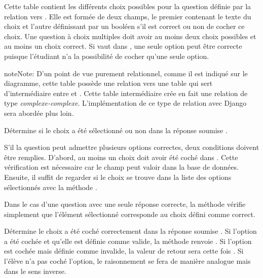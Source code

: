 \documentclass[a4,10pt,french]{sphinxmanual}
\begin{document}
\begin{fulllineitems}
\label{database:quiz.models.QcmChoice}
Cette table contient les différents choix possibles pour la question définie
par la relation vers . Elle est formée de deux champs, le premier contenant
le texte du choix et l'autre définissant par un booléen s'il est correct ou
non de cocher ce choix. Une question à choix multiples doit avoir au moins
deux choix possibles et au moins un choix correct. Si  vaut
 dans , une seule option peut être correcte puisque l'étudiant
n'a la possibilité de cocher qu'une seule option.

\begin{notice}{note}{Note:}
D'un point de vue purement relationnel, comme il est indiqué sur
le diagramme, cette table possède une relation vers une table qui sert
d'intermédiaire entre  et . Cette table intermédiaire
crée en fait une relation de type \emph{complexe-complexe}. L'implémentation de ce
type de relation avec Django sera abordée plus loin.
\end{notice}

\begin{fulllineitems}
\label{database:quiz.models.QcmChoice.checked}
Détermine si le choix a été sélectionné ou non dans la réponse soumise
.

S'il la question peut admettre plusieurs options correctes, deux conditions doivent
être remplies. D'abord, au moins un choix doit avoir été coché dans .
Cette vérification est nécessaire car le champ  peut
valoir  dans la base de données. Ensuite, il suffit de regarder
si le choix se trouve dans la liste des options sélectionnés avec la méthode
.

Dans le cas d'une question avec une seule réponse correcte, la méthode
vérifie simplement que l'élément sélectionné corresponde au choix défini comme
correct.

\end{fulllineitems}


\begin{fulllineitems}
\label{database:quiz.models.QcmChoice.correct_submit}
Détermine le choix  a été coché correctement dans la réponse
soumise . Si l'option a été cochée et qu'elle est définie
comme valide, la méthode renvoie . Si l'option est cochée mais
définie comme invalide, la valeur de retour sera cette fois .
Si l'élève n'a pas coché l'option, le raisonnement se fera de manière analogue
mais dans le sens inverse.


\end{fulllineitems}
\end{fulllineitems}
\end{document}
